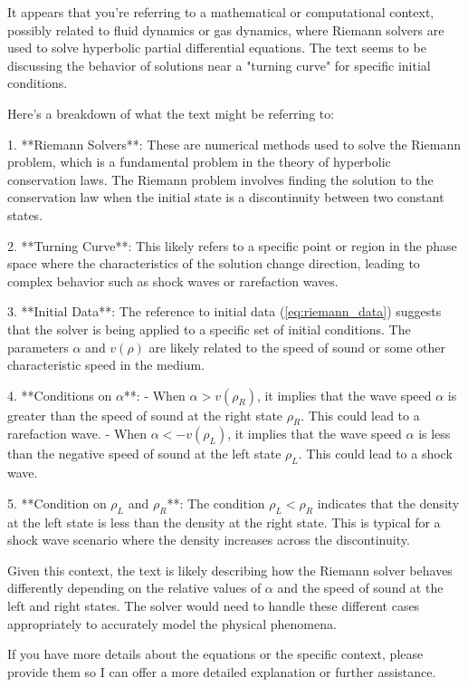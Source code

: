It appears that you're referring to a mathematical or computational context, possibly related to fluid dynamics or gas dynamics, where Riemann solvers are used to solve hyperbolic partial differential equations. The text seems to be discussing the behavior of solutions near a "turning curve" for specific initial conditions.

Here's a breakdown of what the text might be referring to:

1. **Riemann Solvers**: These are numerical methods used to solve the Riemann problem, which is a fundamental problem in the theory of hyperbolic conservation laws. The Riemann problem involves finding the solution to the conservation law when the initial state is a discontinuity between two constant states.

2. **Turning Curve**: This likely refers to a specific point or region in the phase space where the characteristics of the solution change direction, leading to complex behavior such as shock waves or rarefaction waves.

3. **Initial Data**: The reference to initial data (\eqref{eq:riemann_data}) suggests that the solver is being applied to a specific set of initial conditions. The parameters \(\alpha\) and \(v(\rho)\) are likely related to the speed of sound or some other characteristic speed in the medium.

4. **Conditions on \(\alpha\)**:
   - When \(\alpha > v(\rho_R)\), it implies that the wave speed \(\alpha\) is greater than the speed of sound at the right state \(\rho_R\). This could lead to a rarefaction wave.
   - When \(\alpha < -v(\rho_L)\), it implies that the wave speed \(\alpha\) is less than the negative speed of sound at the left state \(\rho_L\). This could lead to a shock wave.

5. **Condition on \(\rho_L\) and \(\rho_R\)**: The condition \(\rho_L < \rho_R\) indicates that the density at the left state is less than the density at the right state. This is typical for a shock wave scenario where the density increases across the discontinuity.

Given this context, the text is likely describing how the Riemann solver behaves differently depending on the relative values of \(\alpha\) and the speed of sound at the left and right states. The solver would need to handle these different cases appropriately to accurately model the physical phenomena.

If you have more details about the equations or the specific context, please provide them so I can offer a more detailed explanation or further assistance.
